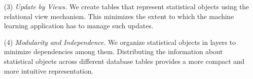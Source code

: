 \documentclass{acm_proc_article-sp}
\begin{document}
(3) {\em Update by Views.} We create tables that represent statistical objects using the relational view mechanism. This minimizes the extent to which the machine learning application has to manage such updates.

(4) {\em Modularity and Independence.} We organize statistical objects in layers to minimize dependencies among them. Distributing the information about statistical objects across different database tables provides a more compact and more intuitive representation.





%



\end{document}
